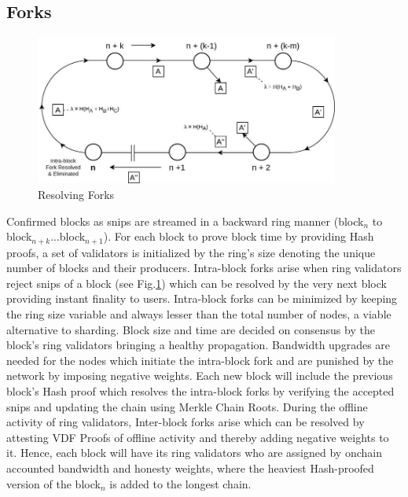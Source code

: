 \documentclass[a4paper,10pt]{article}
\begin{document}
 \subsection{Forks}
\begin{figure}[h]
\begin{center}
\includegraphics[width=10cm]{intrafork}
\caption{Resolving Forks}
\label{fork}
\end{center}
\end{figure}
Confirmed blocks as snips are streamed in a backward ring manner (block$_n$ to block$_{n+k}$...block$_{n+1}$). For each block to prove block time by providing Hash proofs, a set of validators is initialized by the ring's size denoting the unique number of blocks and their producers. Intra-block forks arise when ring validators reject snips of a block (see Fig.\ref{fork}) which can be resolved by the very next block providing instant finality to users. Intra-block forks can be minimized by keeping the ring size variable and always lesser than the total number of nodes, a viable alternative to sharding. Block size and time are decided on consensus by the block's ring validators bringing a healthy propagation. Bandwidth upgrades are needed for the nodes which initiate the intra-block fork and are punished by the network by imposing negative weights. Each new block will include the previous block's Hash proof which resolves the intra-block forks by verifying the accepted snips and updating the chain using Merkle Chain Roots. During the offline activity of ring validators, Inter-block forks arise which can be resolved by attesting VDF Proofs of offline activity and thereby adding negative weights to it. Hence, each block will have its ring validators who are assigned by onchain accounted bandwidth and honesty weights, where the heaviest Hash-proofed version of the block$_n$ is added to the longest chain.
\end{document}
